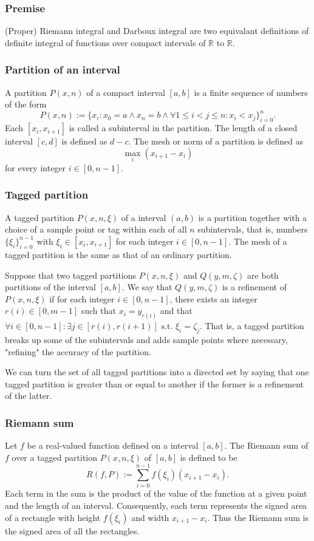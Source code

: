 \documentclass[a4paper,12pt]{report}
\begin{document}
\begin{itemize}
\begin{itemize}
\subsubsection{Premise}
(Proper) Riemann integral and Darboux integral are two equivalant definitions of definite integral of functions over compact intervals of $\mathbb{R}$ to $\mathbb{R}$.
\subsubsection{Partition of an interval}
A partition $P(x, n)$ of a compact interval $[a,b]$ is a finite sequence of numbers of the form
\[P(x, n):=\{x_i\colon x_0=a\land x_n=b\land\forall 1\leq i<j\leq n\colon x_i<x_j\}_{i=0}^n.\]
Each $[x_i, x_{i+1}]$ is called a subinterval in the partition. The length of a closed interval $[c,d]$ is defined as $d-c$. The mesh or norm of a partition is defined as
\[\max_i\left(x_{i+1}-x_{i}\right)\]
for every integer $i\in [0,n-1]$.
\subsubsection{Tagged partition}
A tagged partition $P(x,n,\xi)$ of a interval $(a,b)$ is a partition together with a choice of a sample point or tag within each of all $n$ subintervals, that is, numbers $\{\xi_i\}_{i=0}^{n-1}$ with $\xi_i\in [x_i,x_{i+1}]$ for each integer $i\in [0,n-1]$. The mesh of a tagged partition is the same as that of an ordinary partition.

Suppose that two tagged partitions $P(x,n,\xi)$ and $Q(y,m,\zeta)$ are both partitions of the interval $[a,b]$. We say that $Q(y,m,\zeta)$ is a refinement of $P(x,n,\xi)$ if for each integer $i\in [0,n-1]$, there exists an integer $r(i)\in [0,m-1]$ such that $x_i = y_{r(i)}$ and that $\forall i\in [0,n-1]\colon\exists j\in [r(i),r(i + 1)] \text{\ s.t.\ }\xi_i = \zeta_j$. That is, a tagged partition breaks up some of the subintervals and adds sample points where necessary, "refining" the accuracy of the partition.

We can turn the set of all tagged partitions into a directed set by saying that one tagged partition is greater than or equal to another if the former is a refinement of the latter.
\subsubsection{Riemann sum}
Let $f$ be a real-valued function defined on a interval $[a,b]$. The Riemann sum of $f$ over a tagged partition $P(x,n,\xi)$ of $[a,b]$ is defined to be
\[R(f,P):=\sum_{i=0}^{n-1}f(\xi_i)\left(x_{i+1}-x_i\right).\]
Each term in the sum is the product of the value of the function at a given point and the length of an interval. Consequently, each term represents the signed area of a rectangle with height $f(\xi_i)$ and width $x_{i + 1} − x_i$. Thus the Riemann sum is the signed area of all the rectangles.

\end{itemize}
\end{itemize}
\end{document}
